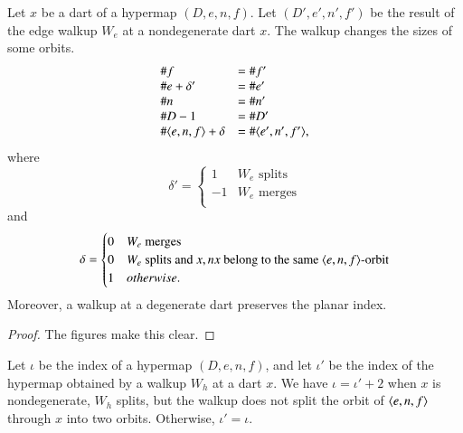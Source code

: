 \begin{lemma}\label{lemma:index} Let $x$ be a dart of a hypermap $(D,e,n,f)$. Let $(D',e',n',f')$ be the result of the edge walkup $W_e$ at
a nondegenerate dart $x$.  
The walkup changes the sizes of some orbits.
    $$
    \begin{array}{lll}
    \# f &= \# f'\\  
    \# e + \delta' &= \# e'\\
    \# n &= \# n'\\
    \# D - 1&= \# D' \\
    \# \langle e,n,f\rangle + \delta&= \#\langle e',n',f'\rangle,\\
    \end{array}
    $$
where
   $$
   \delta' = \begin{cases}
     1 & W_e \text{ splits }\\
    -1 & W_e \text{ merges}\\
   \end{cases}
   $$
and
   $$
   \delta = \begin{cases}
    0 & W_e \text{ merges }\\
    0 & W_e \text{ splits and } x,nx \text{ belong to the same } \langle e,n,f\rangle\text{-orbit}\\
    1 & otherwise.
     \end{cases}
   $$
Moreover, a walkup at a degenerate dart preserves the planar index.
\end{lemma}

\begin{proof} The figures make this clear.
\end{proof}

\begin{lemma}  Let $\iota$ be the index of a  hypermap $(D,e,n,f)$, and
let $\iota'$ be the index of the hypermap obtained by a walkup
$W_h$
at a dart $x$.  We have $\iota = \iota' + 2$ when
$x$ is nondegenerate, $W_h$ splits, but the walkup does not
split the orbit of $\langle e,n,f\rangle$ through $x$ into two orbits.
Otherwise, $\iota'=\iota$.
\end{lemma} 





